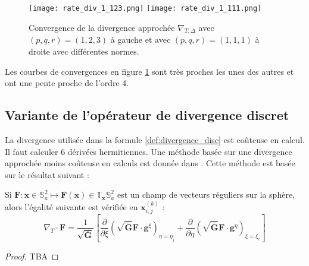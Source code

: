 \begin{figure}[htbp]
\begin{center}
\texttt{[image: rate\_div\_1\_123.png]}
\texttt{[image: rate\_div\_1\_111.png]}
\end{center}
\caption{Convergence de la divergence approchée $\nabla_{T,\Delta}$ avec $(p,q,r)=(1,2,3)$ à gauche et avec $(p,q,r)=(1,1,1)$ à droite avec différentes normes.}
\label{fig:rate_div1}
\end{figure}

Les courbes de convergences en figure \ref{fig:rate_div1} sont très proches les unes des autres et ont une pente proche de l'ordre 4.


\subsection{Variante de l'opérateur de divergence discret}

La divergence utilisée dans la formule \eqref{def:divergence_disc} est coûteuse en calcul. Il faut calculer 6 dérivées hermitiennes. Une méthode basée sur une divergence approchée moins coûteuse en calculs est donnée dans \cite{Croisille2015}. Cette méthode est basée sur le résultat suivant :

\begin{proposition}
Si $\mathbf{F} : \mathbf{x} \in \mathbb{S}_a^2 \mapsto \mathbf{F}(\mathbf{x}) \in \mathbb{T}_{\mathbf{x}} \mathbb{S}_a^2$ est un champ de vecteurs réguliers sur la sphère, alors l'égalité suivante est vérifiée en $\mathbf{x}_{i,j}^{(k)}$ :
\begin{equation}
\nabla_T \cdot \mathbf{F} = \dfrac{1}{\sqrt{\bar{\mathbf{G}}}} \left[ \dfrac{\partial}{\partial \xi} \left( \sqrt{\bar{\mathbf{G}}} \mathbf{F} \cdot \mathbf{g}^{\xi} \right)_{\eta = \eta_j} + 
\dfrac{\partial}{\partial \eta} \left( \sqrt{\bar{\mathbf{G}}} \mathbf{F} \cdot \mathbf{g}^{\eta} \right)_{\xi = \xi_i}
\right]
\label{eq:divergence_v2}
\end{equation}
\end{proposition}

\begin{proof}
TBA
\end{proof}

